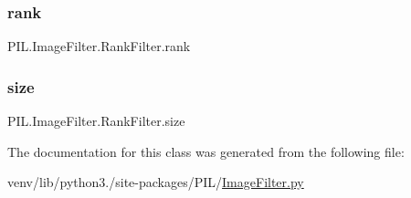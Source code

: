 \subsubsection{\texorpdfstring{rank}{rank}}
{\footnotesize\ttfamily P\+I\+L.\+Image\+Filter.\+Rank\+Filter.\+rank}

\mbox{\label{classPIL_1_1ImageFilter_1_1RankFilter_a0bc57f5d65445f9500239870e164a89c}} 
\subsubsection{\texorpdfstring{size}{size}}
{\footnotesize\ttfamily P\+I\+L.\+Image\+Filter.\+Rank\+Filter.\+size}



The documentation for this class was generated from the following file\+:\begin{DoxyCompactItemize}
\item 
venv/lib/python3./site-\/packages/\+P\+I\+L/\hyperlink{ImageFilter_8py}{Image\+Filter.\+py}\end{DoxyCompactItemize}
